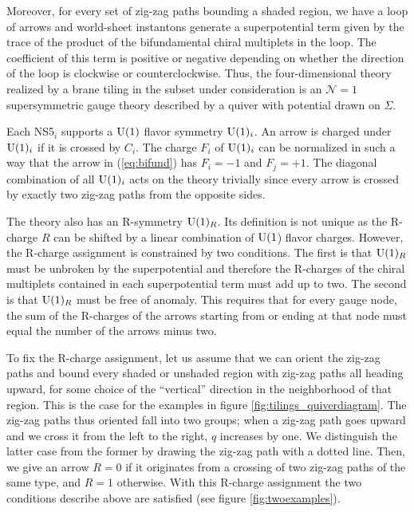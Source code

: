 Moreover, for every set of zig-zag paths bounding a shaded region,
we have a loop of arrows and world-sheet instantons generate a superpotential
term given by the trace of the product of the bifundamental chiral
multiplets in the loop. The coefficient of this term is positive or
negative depending on whether the direction of the loop is clockwise
or counterclockwise. Thus, the four-dimensional theory realized by
a brane tiling in the subset under consideration is an $\mathcal{N}=1$
supersymmetric gauge theory described by a quiver with potential drawn
on $\Sigma$. 

Each NS5$_{i}$ supports a $\mathrm{U}(1)$ flavor symmetry $\mathrm{U}(1)_{i}$. An
arrow is charged under $\mathrm{U}(1)_{i}$ if it is crossed by $C_{i}$. The
charge $F_{i}$ of $\mathrm{U}(1)_{i}$ can be normalized in such a way that
the arrow in (\ref{eq:bifund}) has $F_{i}=-1$ and $F_{j}=+1$. The
diagonal combination of all $\mathrm{U}(1)_{i}$ acts on the theory trivially
since every arrow is crossed by exactly two zig-zag paths from the
opposite sides. 

The theory also has an R-symmetry $\mathrm{U}(1)_{R}$. Its definition is not
unique as the R-charge $R$ can be shifted by a linear combination
of $\mathrm{U}(1$) flavor charges. However, the R-charge assignment is constrained
by two conditions. The first is that $\mathrm{U}(1)_{R}$ must be unbroken
by the superpotential and therefore the R-charges of the chiral multiplets
contained in each superpotential term must add up to two. The second
is that $\mathrm{U}(1)_{R}$ must be free of anomaly. This requires that for
every gauge node, the sum of the R-charges of the arrows starting
from or ending at that node must equal the number of the arrows minus
two. 

To fix the R-charge assignment, let us assume that we can orient the
zig-zag paths and bound every shaded or unshaded region with zig-zag
paths all heading upward, for some choice of the ``vertical'' direction
in the neighborhood of that region. This is the case for the examples
in figure \ref{fig:tilings_quiverdiagram}. The zig-zag paths thus oriented fall into two groups; when
a zig-zag path goes upward and we cross it from the left to the right,
$q$ increases by one. We distinguish the latter case from the former
by drawing the zig-zag path with a dotted line. Then, we give an arrow
$R=0$ if it originates from a crossing of two zig-zag paths of the
same type, and $R=1$ otherwise. With this R-charge assignment the
two conditions describe above are satisfied (see figure \ref{fig:twoexamples}). 


